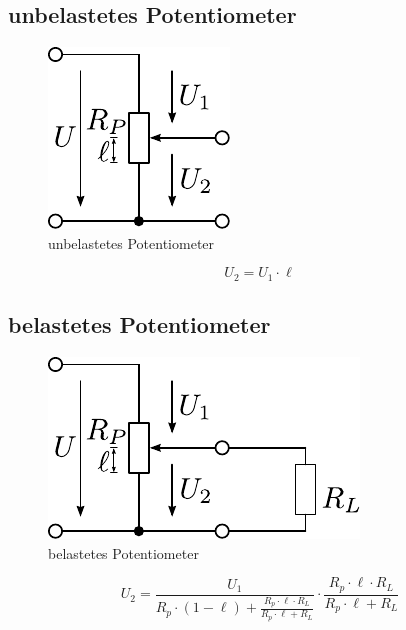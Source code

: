 \newpage
\subsection{unbelastetes Potentiometer}
\begin{figure}[h!]
	\centering
	\includegraphics[scale=\schscale]{../fig/poti.pdf}
	\caption{unbelastetes Potentiometer}
	\label{sch:poti}
\end{figure}
\[ U_2 = U_1 \cdot \ell \]

\subsection{belastetes Potentiometer}
\begin{figure}[h!]
	\centering
	\includegraphics[scale=\schscale]{../fig/potibel.pdf}
	\caption{belastetes Potentiometer}
	\label{sch:potibel}
\end{figure}
\[ U_2 = \frac{U_1}{R_p \cdot (1 - \ell) + \frac{R_p \cdot \ell \cdot R_L}{R_p \cdot \ell + R_L}} \cdot \frac{R_p \cdot \ell \cdot R_L}{R_p \cdot \ell + R_L} \]
